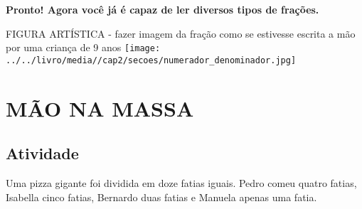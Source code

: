 \documentclass[a4,12pt]{book}
\begin{document}
{\bf Pronto! Agora você já é capaz de ler diversos tipos de frações.}

\begin{imagem*}[breakable]{}{}   FIGURA ARTÍSTICA - fazer imagem da fração como se estivesse escrita a mão por uma criança de 9 anos   \mbox{} \newline        \texttt{[image: ../../livro/media//cap2/secoes/numerador\_denominador.jpg]}   \end{imagem*}


\section{MÃO NA MASSA }

\subsection{Atividade}

Uma pizza gigante foi dividida em doze fatias iguais. 
Pedro comeu quatro fatias, Isabella cinco fatias, Bernardo duas fatias e Manuela apenas uma fatia.
\end{document}
